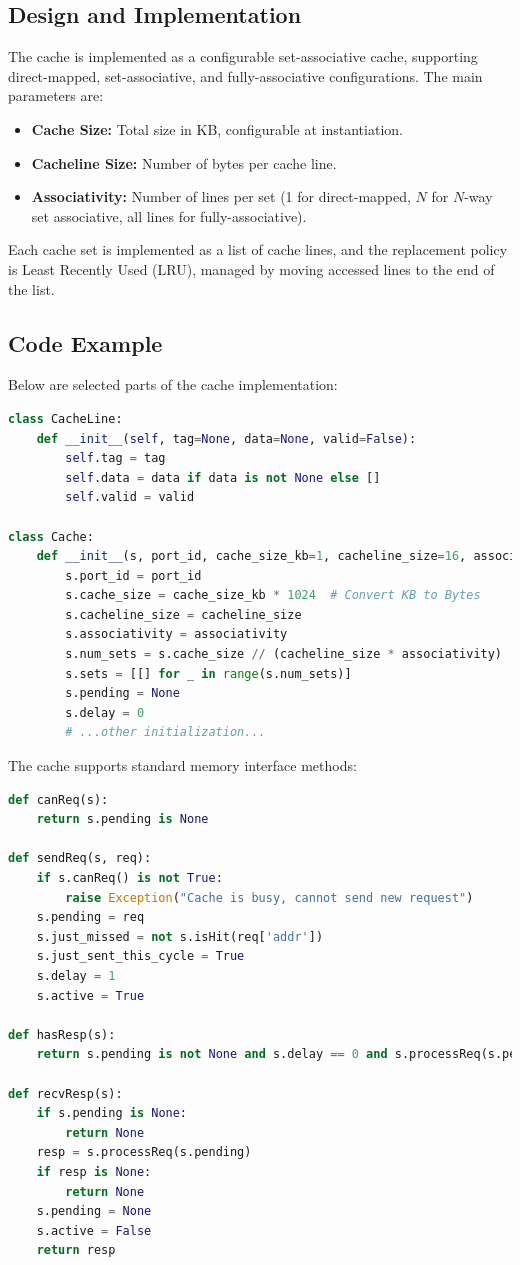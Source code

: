 \documentclass[12pt,a4paper]{report}
\begin{document}
\subsection{Design and Implementation}
The cache is implemented as a configurable set-associative cache, supporting direct-mapped, set-associative, and fully-associative configurations. The main parameters are:
\begin{itemize}
  \item \textbf{Cache Size:} Total size in KB, configurable at instantiation.
  \item \textbf{Cacheline Size:} Number of bytes per cache line.
  \item \textbf{Associativity:} Number of lines per set (1 for direct-mapped, $N$ for $N$-way set associative, all lines for fully-associative).
\end{itemize}
Each cache set is implemented as a list of cache lines, and the replacement policy is Least Recently Used (LRU), managed by moving accessed lines to the end of the list.

\subsection{Code Example}
Below are selected parts of the cache implementation:

\begin{lstlisting}[language=Python]
class CacheLine:
    def __init__(self, tag=None, data=None, valid=False):
        self.tag = tag
        self.data = data if data is not None else []
        self.valid = valid

class Cache:
    def __init__(s, port_id, cache_size_kb=1, cacheline_size=16, associativity=1):
        s.port_id = port_id
        s.cache_size = cache_size_kb * 1024  # Convert KB to Bytes
        s.cacheline_size = cacheline_size
        s.associativity = associativity
        s.num_sets = s.cache_size // (cacheline_size * associativity)
        s.sets = [[] for _ in range(s.num_sets)]
        s.pending = None
        s.delay = 0
        # ...other initialization...
\end{lstlisting}

The cache supports standard memory interface methods:

\begin{lstlisting}[language=Python]
def canReq(s):
    return s.pending is None

def sendReq(s, req):
    if s.canReq() is not True:
        raise Exception("Cache is busy, cannot send new request")
    s.pending = req
    s.just_missed = not s.isHit(req['addr'])
    s.just_sent_this_cycle = True
    s.delay = 1
    s.active = True

def hasResp(s):
    return s.pending is not None and s.delay == 0 and s.processReq(s.pending) is not None

def recvResp(s):
    if s.pending is None:
        return None
    resp = s.processReq(s.pending)
    if resp is None:
        return None
    s.pending = None
    s.active = False
    return resp
\end{lstlisting}
\end{document}
